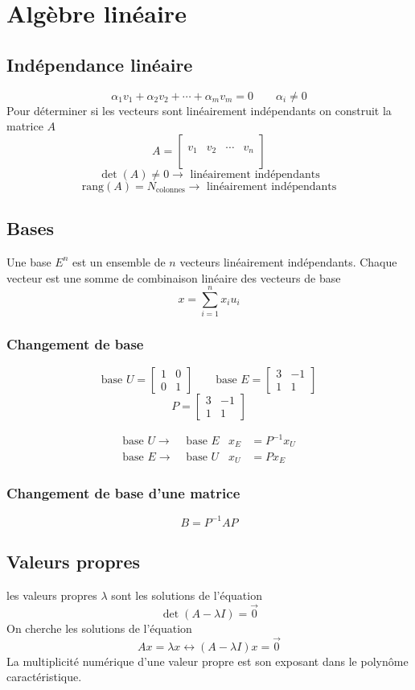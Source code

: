 \documentclass[resume]{subfiles}
\begin{document}
\section{Algèbre linéaire}
\subsection{Indépendance linéaire}
$$\alpha_1 v_1+\alpha_2v_2+\cdots+\alpha_mv_m=0\qquad \alpha_i\neq 0$$
Pour déterminer si les vecteurs sont linéairement indépendants on construit la matrice $A$
$$A=\begin{bmatrix}
\\
v_1 & v_2 & \cdots & v_n\\
\\
\end{bmatrix}$$
$$\det(A)\neq 0\longrightarrow \text{ linéairement indépendants}$$
$$\text{rang}(A)=N_\text{colonnes}\longrightarrow \text{ linéairement indépendants}$$
\subsection{Bases}
Une base $E^n$ est un ensemble de $n$ vecteurs linéairement indépendants. Chaque vecteur est une somme de combinaison linéaire des vecteurs de base
$$x=\sum_{i=1}^{n} x_iu_i$$
\subsubsection{Changement de base}
$$\text{base }U=\begin{bmatrix}
1 & 0\\
0 & 1
\end{bmatrix}\qquad \text{base }E=\begin{bmatrix}
3 & -1\\
1 & 1
\end{bmatrix}$$
$$P=\begin{bmatrix}
3 & -1\\
1 & 1
\end{bmatrix}$$

\begin{align*}
\text{base }U\longrightarrow &\text{ base }E & x_E&=P^{-1}x_U\\
\text{base }E\longrightarrow &\text{ base }U & x_U&=Px_E
\end{align*}
\subsubsection{Changement de base d'une matrice}
$$B=P^{-1}AP$$
\subsection{Valeurs propres}
les valeurs propres $\lambda$ sont les solutions de l'équation
$$\det\left(A-\lambda I\right)=\vec{0}$$
On cherche les solutions de l'équation
$$\boxed{Ax=\lambda x}\longleftrightarrow \boxed{(A-\lambda I)x=\vec{0}}$$
La multiplicité numérique d'une valeur propre est son exposant dans le polynôme caractéristique.
\end{document}
